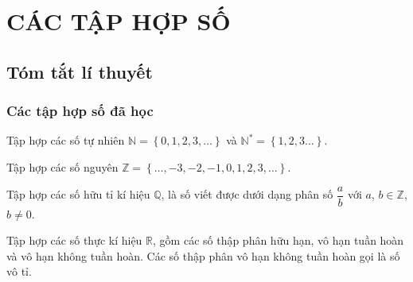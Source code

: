 \section{CÁC TẬP HỢP SỐ}
\subsection{Tóm tắt lí thuyết}
\subsubsection{Các tập hợp số đã học}
\begin{dn}
Tập hợp các số tự nhiên $\mathbb{N}=\left\{0,1,2,3,\ldots\right\}$ và $\mathbb{N}^*=\left\{1,2,3\ldots\right\}$.
\end{dn}

\begin{dn}
Tập hợp các số nguyên $\mathbb{Z}=\left\{\ldots,-3,-2,-1,0,1,2,3,\ldots\right\}$.
\end{dn}

\begin{dn}
Tập hợp các số hữu tỉ kí hiệu $\mathbb{Q}$, là số viết được dưới dạng phân số $\dfrac{a}{b}$ với $a$, $b\in\mathbb{Z}$, $b\neq 0$.
\end{dn}

\begin{dn}
Tập hợp các số thực kí hiệu $\mathbb{R}$, gồm các số thập phân hữu hạn, vô hạn tuần hoàn và vô hạn không tuần hoàn. Các số thập phân vô hạn không tuần hoàn gọi là số vô tỉ.
\end{dn}
